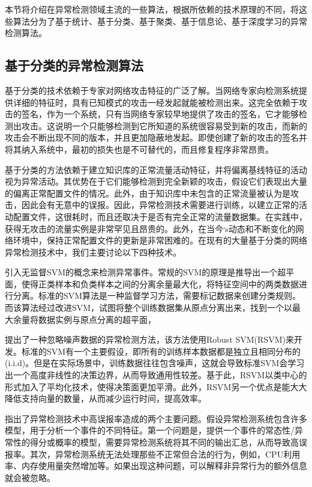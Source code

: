 本节将介绍在异常检测领域主流的一些算法，根据所依赖的技术原理的不同，将这些算法分为了基于统计、基于分类、基于聚类、基于信息论、基于深度学习的异常检测算法。

\subsection{基于分类的异常检测算法}

基于分类的技术依赖于专家对网络攻击特征的广泛了解。当网络专家向检测系统提供详细的特征时，具有已知模式的攻击一经发起就能被检测出来。这完全依赖于攻击的签名，作为一个系统，只有当网络专家较早地提供了攻击的签名，它才能够检测出攻击。这说明一个只能够检测到它所知道的系统很容易受到新的攻击，而新的攻击会不断出现不同的版本，并且更加隐蔽地发起。即使创建了新的攻击的签名并将其纳入系统中，最初的损失也是不可替代的，而且修复程序非常昂贵。

基于分类的方法依赖于建立知识库的正常流量活动特征，并将偏离基线特征的活动视为异常活动。其优势在于它们能够检测到完全新颖的攻击，假设它们表现出大量的偏离正常配置文件的情况。此外，由于知识库中未包含的正常流量被认为是攻击，因此会有无意中的误报。因此，异常检测技术需要进行训练，以建立正常的活动配置文件，这很耗时，而且还取决于是否有完全正常的流量数据集。在实践中，获得无攻击的流量实例是非常罕见且昂贵的。此外，在当今׳s动态和不断变化的网络环境中，保持正常配置文件的更新是非常困难的。在现有的大量基于分类的网络异常检测技术中，我们主要讨论以下四种技术。

\citet{2002AEskin} 引入无监督SVM的概念来检测异常事件。常规的SVM的原理是推导出一个超平面，使得正类样本和负类样本之间的分离余量最大化，将特征空间中的两类数据进行分离。标准的SVM算法是一种监督学习方法，需要标记数据来创建分类规则。而该算法经过改进SVM，试图将整个训练数据集从原点分离出来，找到一个以最大余量将数据实例与原点分离的超平面，

\citet{Hu2003Robust} 提出了一种忽略噪声数据的异常检测方法，该方法使用Robust SVM(RSVM)来开发。标准的SVM有一个主要假设，即所有的训练样本数据都是独立且相同分布的(i.i.d)。但是在实际场景中，训练数据往往包含噪声，这就会导致标准SVM会学习出一个高度非线性的决策边界，从而导致通用性较差。基于此，RSVM以类中心的形式加入了平均化技术，使得决策面更加平滑。此外，RSVM另一个优点是能大大降低支持向量的数量，从而减少运行时间，提高效率。

\citet{kruegel2003bayesian} 指出了异常检测技术中高误报率造成的两个主要问题。假设异常检测系统包含许多模型，用于分析一个事件的不同特征。第一个问题是，提供一个事件的常态性/异常性的得分或概率的模型，需要异常检测系统将其不同的输出汇总，从而导致高误报率。其次，异常检测系统无法处理那些不正常但合法的行为，例如，CPU利用率、内存使用量突然增加等。如果出现这种问题，可以解释非异常行为的额外信息就会被忽略。


